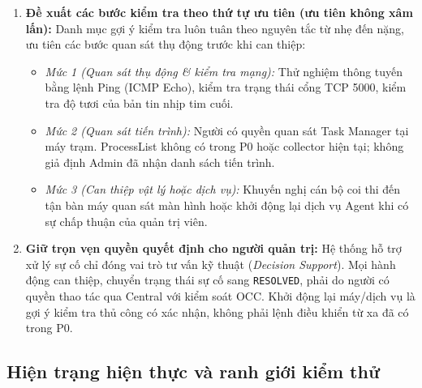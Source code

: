 \documentclass[12pt,a4paper]{article}
\begin{document}
\begin{enumerate}
  \item \textbf{Đề xuất các bước kiểm tra theo thứ tự ưu tiên (ưu tiên không xâm lấn):}
  Danh mục gợi ý kiểm tra luôn tuân theo nguyên tắc từ nhẹ đến nặng, ưu tiên các bước quan sát thụ động trước khi can thiệp:
  \begin{itemize}
    \item \textit{Mức 1 (Quan sát thụ động \& kiểm tra mạng):} Thử nghiệm thông tuyến bằng lệnh Ping (ICMP Echo), kiểm tra trạng thái cổng TCP 5000, kiểm tra độ tươi của bản tin nhịp tim cuối.
    \item \textit{Mức 2 (Quan sát tiến trình):} Người có quyền quan sát Task Manager tại máy trạm. ProcessList không có trong P0 hoặc collector hiện tại; không giả định Admin đã nhận danh sách tiến trình.
    \item \textit{Mức 3 (Can thiệp vật lý hoặc dịch vụ):} Khuyến nghị cán bộ coi thi đến tận bàn máy quan sát màn hình hoặc khởi động lại dịch vụ Agent khi có sự chấp thuận của quản trị viên.
  \end{itemize}

  \item \textbf{Giữ trọn vẹn quyền quyết định cho người quản trị:}
  Hệ thống hỗ trợ xử lý sự cố chỉ đóng vai trò tư vấn kỹ thuật (\textit{Decision Support}). Mọi hành động can thiệp, chuyển trạng thái sự cố sang \texttt{RESOLVED}, phải do người có quyền thao tác qua Central với kiểm soát OCC. Khởi động lại máy/dịch vụ là gợi ý kiểm tra thủ công có xác nhận, không phải lệnh điều khiển từ xa đã có trong P0.
\end{enumerate}

\subsection{Hiện trạng hiện thực và ranh giới kiểm thử}
\end{document}
